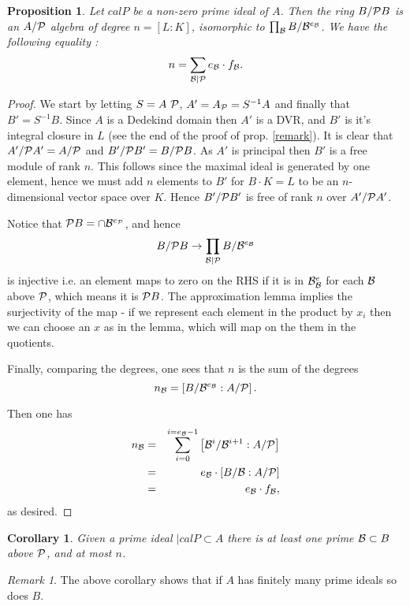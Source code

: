 \documentclass[11pt]{article} %
\newtheorem{cor}{Corollary}
\newtheorem{prop}{Proposition}
\theoremstyle{remark}\newtheorem*{rem}{Remark}
\begin{document}
\begin{prop}
 Let $cal P$ be a non-zero prime ideal of $A$. 
 Then the ring $B/{\cal P}B$ is an $A/\cal P$ algebra of degree $n=[L:K]$, isomorphic to $\prod _{\cal B} B/{\cal B}^{e_{\cal B}}$.
 We have the following equality :
 \[
  n = \sum_{\cal B|P} e_{\cal B}\cdot f_{\cal B}.
 \]
\end{prop}
\begin{proof}
 We start by letting $S=A\ \cal P$, $A' = A_{\cal P} = S^{-1}A$ and finally that $B' = S^{-1}B$.
 Since $A$ is a Dedekind domain then $A'$ is a DVR, and $B'$ is it's integral closure in $L$ (see the end of the proof of prop. \ref{remark}).
 It is clear that $A'/{\cal P}A' = A/\cal P$ and $B'/{\cal P}B' = B/{\cal P}B$.
 As $A'$ is principal then $B'$ is a free module of rank $n$.
 This follows since the maximal ideal is generated by one element, hence we must add $n$ elements to $B'$ for $B\cdot K = L$ to be an $n$-dimensional vector space over $K$.
 Hence $B'/{\cal P} B'$ is free of rank $n$ over $A'/{\cal P}A'$.
 
 
 Notice that ${\cal P} B = \cap {\cal B}^{e_{\cal P}}$, and hence 
 \[
  B/{\cal P}B \rightarrow \prod_{\cal B|P} B/{\cal B}^{e_{\cal B}}
 \]
is injective i.e. an element maps to zero on the RHS if it is in ${\cal B}^e_{\cal B}$ for each $\cal B$ above $\cal P$, which means it is ${\cal P} B$.
The approximation lemma implies the surjectivity of the map - if we represent each element in the product by $x_i$ then we can choose an $x$ as in the lemma, which will map on the them in the quotients.

Finally, comparing the degrees, one sees that $n$ is the sum of the degrees
\[
 n_{\cal B} = \left[B/{\cal B}^{e_{\cal B}} : A/{\cal P}\right].
\]

Then one has 
\begin{eqnarray*}
 n_{\cal B} & = & \sum_{i=0}^{i = e_{\cal B} - 1} \left[ {\cal B}^i/{\cal B}^{i + 1}: A/{\cal P}\right]\\
 & = & e_{\cal B} \cdot \left[ B/{\cal B}:A/{\cal P}\right] \\
 & = & e_{\cal B}\cdot f_{\cal B},
\end{eqnarray*}
as desired.
\end{proof}

\begin{cor}
 Given a prime ideal ${|cal P}\subset A$ there is at least one prime ${\cal B} \subset B$ above $\cal P$, and at  most $n$.
\end{cor}
\begin{rem}
 The above corollary shows that if $A$ has finitely many prime ideals so does $B$.
\end{rem}
\end{document}
